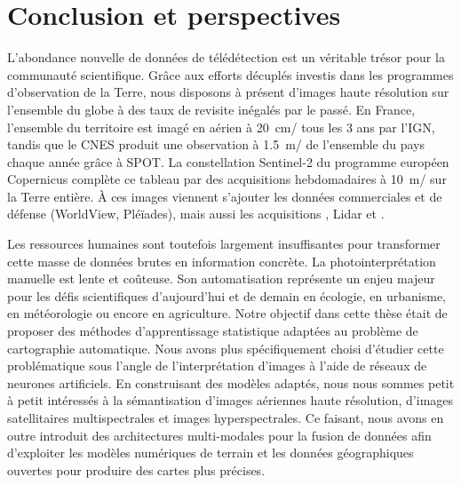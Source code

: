\chapter{Conclusion et perspectives}
\label{chap:conclusion}
\minitoc

L'abondance nouvelle de données de télédétection est un véritable trésor pour la communauté scientifique. Grâce aux efforts décuplés investis dans les programmes d'observation de la Terre, nous disposons à présent d'images haute résolution sur l'ensemble du globe à des taux de revisite inégalés par le passé. En France, l'ensemble du territoire est imagé en aérien à \SI{20}{\centi\meter/\px} tous les 3 ans par l'\gls{IGN}, tandis que le \gls{CNES} produit une observation à \SI{1,5}{\meter/\px} de l'ensemble du pays chaque année grâce à \gls{SPOT}. La constellation \gls{Sentinel}-2 du programme européen Copernicus complète ce tableau par des acquisitions hebdomadaires à \SI{10}{\meter/\px} sur la Terre entière. À ces images viennent s'ajouter les données commerciales et de défense (WorldView, Pléïades), mais aussi les acquisitions , \gls{Lidar} et .

Les ressources humaines sont toutefois largement insuffisantes pour transformer cette masse de données brutes en information concrète. La photointerprétation manuelle est lente et coûteuse. Son automatisation représente un enjeu majeur pour les défis scientifiques d'aujourd'hui et de demain en écologie, en urbanisme, en météorologie ou encore en agriculture. Notre objectif dans cette thèse était de proposer des méthodes d'apprentissage statistique adaptées au problème de cartographie automatique. Nous avons plus spécifiquement choisi d'étudier cette problématique sous l'angle de l'interprétation d'images à l'aide de réseaux de neurones artificiels. En construisant des modèles adaptés, nous nous sommes petit à petit intéressés à la sémantisation d'images aériennes haute résolution, d'images satellitaires multispectrales et images hyperspectrales. Ce faisant, nous avons en outre introduit des architectures multi-modales pour la fusion de données afin d'exploiter les modèles numériques de terrain et les données géographiques ouvertes pour produire des cartes plus précises.

